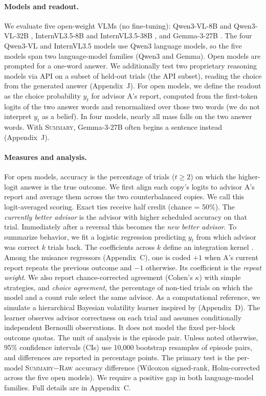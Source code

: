 \documentclass[letterpaper]{article} %
\newcommand{\Raw}{\textsc{Raw}}
\newcommand{\Summary}{\textsc{Summary}}
\begin{document}
\paragraph{Models and readout.} We evaluate five open-weight VLMs (no fine-tuning): Qwen3-VL-8B and Qwen3-VL-32B \citep{bai2025qwen3vl}, InternVL3.5-8B and InternVL3.5-38B \citep{wang2025internvl35}, and Gemma-3-27B \citep{gemmateam2025gemma3}. The four Qwen3-VL and InternVL3.5 models use Qwen3 language models, so the five models span two language-model families (Qwen3 and Gemma). Open models are prompted for a one-word answer. We additionally test two proprietary reasoning models via API on a subset of held-out trials (the API subset), reading the choice from the generated answer (Appendix~J). For open models, we define the readout as the choice probability $y_t$ for advisor A's report, computed from the first-token logits of the two answer words and renormalized over those two words (we do not interpret $y_t$ as a belief). In four models, nearly all mass falls on the two answer words. With \Summary{}, Gemma-3-27B often begins a sentence instead (Appendix~J).

\paragraph{Measures and analysis.} For open models, accuracy is the percentage of trials ($t\ge2$) on which the higher-logit answer is the true outcome. We first align each copy's logits to advisor A's report and average them across the two counterbalanced copies. We call this logit-averaged scoring. Exact ties receive half credit (chance = 50\%). The \emph{currently better advisor} is the advisor with higher scheduled accuracy on that trial. Immediately after a reversal this becomes the \emph{new better advisor}. To summarize behavior, we fit a logistic regression predicting $y_t$ from which advisor was correct $k$ trials back. The coefficients across $k$ define an integration kernel \citep[cf.][]{xue2026counting}. Among the nuisance regressors (Appendix~C), one is coded $+1$ when A's current report repeats the previous outcome and $-1$ otherwise. Its coefficient is the \emph{repeat weight}. We also report chance-corrected agreement (Cohen's $\kappa$) with simple strategies, and \emph{choice agreement}, the percentage of non-tied trials on which the model and a count rule select the same advisor. As a computational reference, we simulate a hierarchical Bayesian volatility learner inspired by \citet{behrens2007learning,behrens2008associative} (Appendix~D). The learner observes advisor correctness on each trial and assumes conditionally independent Bernoulli observations. It does not model the fixed per-block outcome quotas. The unit of analysis is the episode pair. Unless noted otherwise, 95\% confidence intervals (CIs) use 10{,}000 bootstrap resamples of episode pairs, and differences are reported in percentage points. The primary test is the per-model \Summary{}$-$\Raw{} accuracy difference (Wilcoxon signed-rank, Holm-corrected across the five open models). We require a positive gap in both language-model families. Full details are in Appendix~C.
\end{document}

